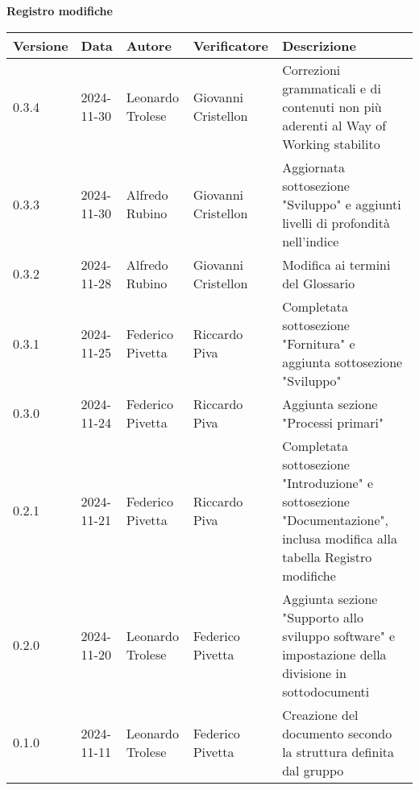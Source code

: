 
\begin{center}
\textbf{Registro modifiche}\\
\vspace{2mm}

\begin{tabularx}{\textwidth}{|l|l|l|l|X|}
\hline
\textbf{Versione} & \textbf{Data} & \textbf{Autore} & \textbf{Verificatore} & \textbf{Descrizione}\\
\hline
    0.3.4 & 2024-11-30  & Leonardo Trolese & Giovanni Cristellon & Correzioni grammaticali e di contenuti non più aderenti al Way of Working stabilito\\
    \hline
    0.3.3 & 2024-11-30  & Alfredo Rubino & Giovanni Cristellon & Aggiornata sottosezione "Sviluppo" e aggiunti livelli di profondità nell'indice\\
    \hline
    0.3.2 & 2024-11-28  & Alfredo Rubino & Giovanni Cristellon & Modifica ai termini del Glossario\\
    \hline
    0.3.1 & 2024-11-25  & Federico Pivetta & Riccardo Piva & Completata sottosezione "Fornitura" e aggiunta sottosezione "Sviluppo"\\
    \hline
    0.3.0 & 2024-11-24  & Federico Pivetta & Riccardo Piva & Aggiunta sezione "Processi primari"\\
    \hline
     0.2.1 & 2024-11-21  & Federico Pivetta  & Riccardo Piva& Completata sottosezione "Introduzione" e sottosezione "Documentazione", inclusa modifica alla tabella Registro modifiche\\
    \hline
    0.2.0 & 2024-11-20  & Leonardo Trolese & Federico Pivetta  & Aggiunta sezione "Supporto allo sviluppo software" e impostazione della divisione in sottodocumenti\\
    \hline
    0.1.0 & 2024-11-11  & Leonardo Trolese & Federico Pivetta  & Creazione del documento secondo la struttura definita dal gruppo\\
    \hline

\end{tabularx}
\end{center}